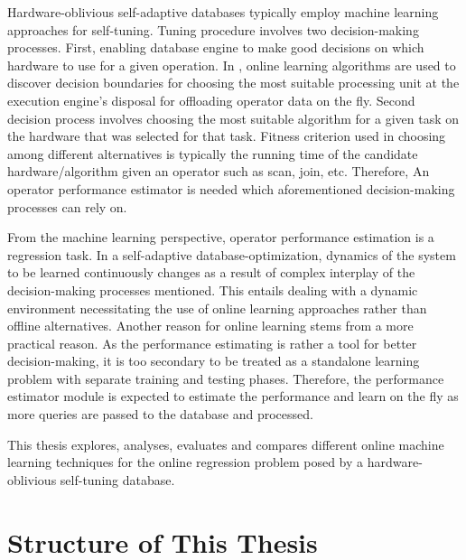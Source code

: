 Hardware-oblivious self-adaptive databases typically employ machine learning approaches for self-tuning. Tuning procedure involves two decision-making processes. First, enabling database engine to make good decisions on which hardware to use for a given operation. In \cite{heimel_demonstrating_2014}, online learning algorithms are used to discover decision boundaries for choosing the most suitable processing unit at the execution engine’s disposal for offloading operator data on the fly. Second decision process involves choosing the most suitable algorithm for a given task on the hardware that was selected for that task. Fitness criterion used in choosing among different alternatives is typically the running time of the candidate hardware/algorithm given an operator such as scan, join, etc. Therefore, An operator performance estimator is needed which aforementioned decision-making processes can rely on.

From the machine learning perspective, operator performance estimation is a regression task. In a self-adaptive database-optimization, dynamics of the system to be learned continuously changes as a result of complex interplay of the decision-making processes mentioned. This entails dealing with a dynamic environment necessitating the use of online learning approaches rather than offline alternatives. Another reason for online learning stems from a more practical reason. As the performance estimating is rather a tool for better decision-making, it is too secondary to be treated as a standalone learning problem with separate training and testing phases. Therefore, the performance estimator module is expected to estimate the performance and learn on the fly as more queries are passed to the database and processed.

This thesis explores, analyses, evaluates and compares different online machine learning techniques for the online regression problem posed by a hardware-oblivious self-tuning database.

\section{Structure of This Thesis}

